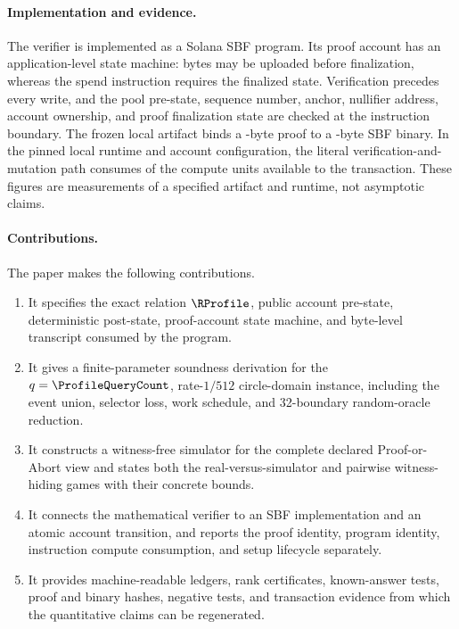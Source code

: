 \paragraph{Implementation and evidence.}
The verifier is implemented as a Solana SBF program.  Its proof account has an
application-level state machine: bytes may be uploaded before finalization,
whereas the spend instruction requires the finalized state.  Verification
precedes every write, and the pool pre-state, sequence number, anchor,
nullifier address, account ownership, and proof finalization state are checked
at the instruction boundary.  The frozen local artifact binds a
\ProfileProofBytes-byte proof to a \ProfileSbfBytes-byte SBF binary.  In the
pinned local runtime and account configuration, the literal
verification-and-mutation path consumes \ProfileComputeUnits{} of the
\ProfileComputeLimit{} compute units available to the transaction.  These
figures are measurements of a specified artifact and runtime, not asymptotic
claims.

\paragraph{Contributions.}
The paper makes the following contributions.

\begin{enumerate}[leftmargin=*,itemsep=0.45em]
  \item It specifies the exact relation $\RProfile$, public account pre-state,
  deterministic post-state, proof-account state machine, and byte-level
  transcript consumed by the program.

  \item It gives a finite-parameter soundness derivation for the
  $q=\ProfileQueryCount$, rate-$1/512$ circle-domain instance, including the
  event union, selector loss, work schedule, and 32-boundary random-oracle
  reduction.

  \item It constructs a witness-free simulator for the complete declared
  Proof-or-Abort view and states both the real-versus-simulator and pairwise
  witness-hiding games with their concrete bounds.

  \item It connects the mathematical verifier to an SBF implementation and an
  atomic account transition, and reports the proof identity, program identity,
  instruction compute consumption, and setup lifecycle separately.

  \item It provides machine-readable ledgers, rank certificates, known-answer
  tests, proof and binary hashes, negative tests, and transaction evidence from
  which the quantitative claims can be regenerated.
\end{enumerate}


